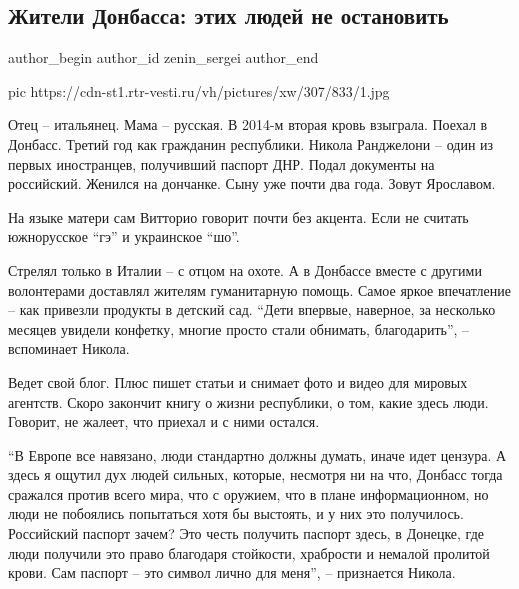  
 
 
 
 
 
\subsection{Жители Донбасса: этих людей не остановить}
\label{sec:13_12_2020.news.ru.vesti.zenin_sergei.1.zhiteli_donbassa_etih_ljudei_ne_ostanovit}
\ifcmt
	author_begin
   author_id zenin_sergei
	author_end
\fi

\ifcmt
pic https://cdn-st1.rtr-vesti.ru/vh/pictures/xw/307/833/1.jpg
\fi

Отец – итальянец. Мама – русская. В 2014-м вторая кровь взыграла. Поехал в
Донбасс. Третий год как гражданин республики. Никола Ранджелони – один из
первых иностранцев, получивший паспорт ДНР. Подал документы на российский.
Женился на дончанке. Сыну уже почти два года. Зовут Ярославом.

На языке матери сам Витторио говорит почти без акцента. Если не считать
южнорусское \enquote{гэ} и украинское \enquote{шо}.

Стрелял только в Италии – с отцом на охоте. А в Донбассе вместе с другими
волонтерами доставлял жителям гуманитарную помощь. Самое яркое впечатление –
как привезли продукты в детский сад. \enquote{Дети впервые, наверное, за несколько
месяцев увидели конфетку, многие просто стали обнимать, благодарить}, –
вспоминает Никола.

Ведет свой блог. Плюс пишет статьи и снимает фото и видео для мировых агентств.
Скоро закончит книгу о жизни республики, о том, какие здесь люди. Говорит, не
жалеет, что приехал и с ними остался.

\enquote{В Европе все навязано, люди стандартно должны думать, иначе идет цензура. А
здесь я ощутил дух людей сильных, которые, несмотря ни на что, Донбасс тогда
сражался против всего мира, что с оружием, что в плане информационном, но люди
не побоялись попытаться хотя бы выстоять, и у них это получилось. Российский
паспорт зачем? Это честь получить паспорт здесь, в Донецке, где люди получили
это право благодаря стойкости, храбрости и немалой пролитой крови. Сам паспорт
– это символ лично для меня}, – признается Никола.

